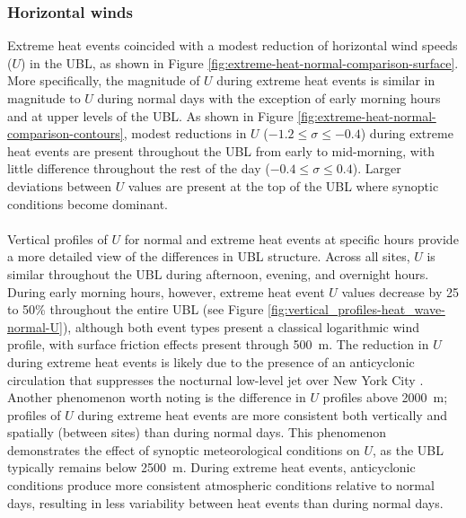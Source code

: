 \subsubsection{Horizontal winds}
Extreme heat events coincided with a modest reduction of horizontal wind speeds ($U$) in the UBL, as shown in Figure \ref{fig:extreme-heat-normal-comparison-surface}. More specifically, the magnitude of $U$ during extreme heat events is similar in magnitude to $U$ during normal days with the exception of early morning hours and at upper levels of the UBL. As shown in Figure \ref{fig:extreme-heat-normal-comparison-contours}, modest reductions in $U$ ($-1.2 \leq \sigma \leq -0.4$) during extreme heat events are present throughout the UBL from early to mid-morning, with little difference throughout the rest of the day ($-0.4 \leq \sigma \leq 0.4$). Larger deviations between $U$ values are present at the top of the UBL where synoptic conditions become dominant.
\\ \\
Vertical profiles of $U$ for normal and extreme heat events at specific hours provide a more detailed view of the differences in UBL structure. Across all sites, $U$ is similar throughout the UBL during afternoon, evening, and overnight hours. During early morning hours, however, extreme heat event $U$ values decrease by 25 to 50\% throughout the entire UBL (see Figure \ref{fig:vertical_profiles-heat_wave-normal-U}), although both event types present a classical logarithmic wind profile, with surface friction effects present through \SI{500}{\meter}. The reduction in $U$ during extreme heat events is likely due to the presence of an anticyclonic circulation that suppresses the nocturnal low-level jet over New York City \citep{chen1993}. Another phenomenon worth noting is the difference in $U$ profiles above \SI{2000}{\meter}; profiles of $U$ during extreme heat events are more consistent both vertically and spatially (between sites) than during normal days. This phenomenon demonstrates the effect of synoptic meteorological conditions on $U$, as the UBL typically remains below \SI{2500}{\meter}. During extreme heat events, anticyclonic conditions produce more consistent atmospheric conditions relative to normal days, resulting in less variability between heat events than during normal days.
\\ \\
